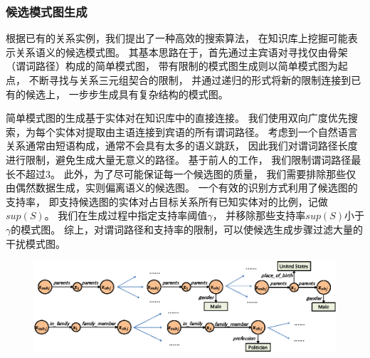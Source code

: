
\subsubsection{候选模式图生成}
\label{sec:schema-candgen}

根据已有的关系实例，我们提出了一种高效的搜索算法，
在知识库上挖掘可能表示关系语义的候选模式图。
其基本思路在于，首先通过主宾语对寻找仅由骨架（谓词路径）构成的简单模式图，
带有限制的模式图生成则以简单模式图为起点，
不断寻找与关系三元组契合的限制，
并通过递归的形式将新的限制连接到已有的候选上，
一步步生成具有复杂结构的模式图。

简单模式图的生成基于实体对在知识库中的直接连接。
我们使用双向广度优先搜索，为每个实体对提取由主语连接到宾语的所有谓词路径。
考虑到一个自然语言关系通常由短语构成，通常不会具有太多的语义跳跃，
因此我们对谓词路径长度进行限制，避免生成大量无意义的路径。
基于前人的工作\parencite{zhang2012ontological}，
我们限制谓词路径最长不超过3。
此外，为了尽可能保证每一个候选图的质量，
我们需要排除那些仅由偶然数据生成，实则偏离语义的候选图。
一个有效的识别方式利用了候选图的支持率，
即支持候选图的实体对占目标关系所有已知实体对的比例，记做$sup(S)$。
我们在生成过程中指定支持率阈值$\gamma$，
并移除那些支持率$sup(S)$小于$\gamma$的模式图。
综上，对谓词路径和支持率的限制，可以使候选生成步骤过滤大量的干扰模式图。

\begin{figure}[tp]
    \centering
    \includegraphics[width=1.0\columnwidth]{figure/schema/schema_gen-crop.eps}
    \label{fig:schema-candgen}
\end{figure}

